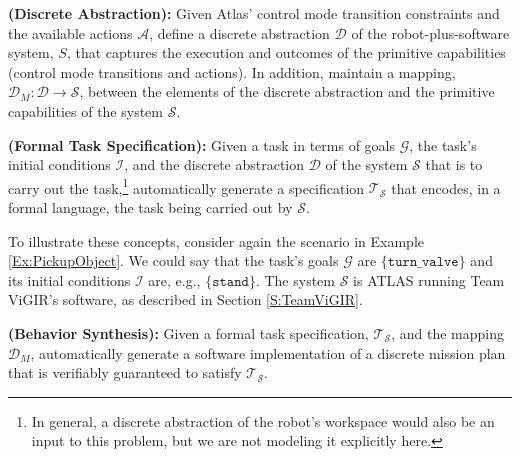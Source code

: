 


\begin{myProblem}\label{DiscreteAbstractionProblem}
\textbf{(Discrete Abstraction):}
Given Atlas' control mode transition constraints and the available actions $\mathcal{A}$, define a discrete abstraction $\mathcal{D}$ of the robot-plus-software system, $S$, that captures the execution and outcomes of the primitive capabilities (control mode transitions and actions).
In addition, maintain a mapping, $\mathcal{D}_M: \mathcal{D} \rightarrow \mathcal{S}$, between the elements of the discrete abstraction and the primitive capabilities of the system $\mathcal{S}$.
\end{myProblem}

\begin{myProblem}\label{SpecificationProblem}
\textbf{(Formal Task Specification):}
Given a task in terms of goals $\mathcal{G}$, the task's initial conditions $\mathcal{I}$, and the discrete abstraction $\mathcal{D}$ of the system $\mathcal{S}$ that is to carry out the task,\footnote{In general, a discrete abstraction of the robot's workspace would also be an input to this problem, but we are not modeling it explicitly here.}
 automatically generate a specification $\mathcal{T}_\mathcal{S}$ that encodes, in a formal language, the task being carried out by $\mathcal{S}$.
\end{myProblem}

To illustrate these concepts, consider again the scenario in Example \ref{Ex:PickupObject}. 
We could say that the task's goals $\mathcal{G}$ are $\{ \mathtt{turn\_valve} \}$ and its initial conditions $\mathcal{I}$ are, e.g., $\{ \mathtt{stand} \}$.
The system $\mathcal{S}$ is ATLAS running Team ViGIR's software, as described in Section \ref{S:TeamViGIR}.

\begin{myProblem}\label{BehaviorSynthesisProblem}
\textbf{(Behavior Synthesis):}
Given a formal task specification, $\mathcal{T}_\mathcal{S}$, and the mapping $\mathcal{D}_M$, automatically generate a software implementation of a discrete mission plan that is verifiably guaranteed to satisfy $\mathcal{T}_\mathcal{S}$.
\end{myProblem}

